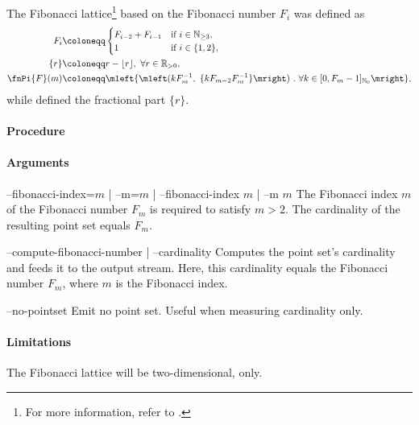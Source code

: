 
The Fibonacci lattice\footnote{For more information, refer to .} based on the Fibonacci number $F_i$ was defined as
\begin{align*}
  F_i &\coloneqq \begin{cases}
    F_{i-2} + F_{i-1} & \text{if}\ i \in \mathbb N_{\geq 3}, \\
    1 & \text{if}\ i \in \{1,2\},
  \end{cases}\\
  \{r\} &\coloneqq r - \lfloor r \rfloor,\ \forall r \in \mathbb R_{> 0}, \\
  \fnPi{F}(m) &\coloneqq \mleft\{ \mleft(k F_m^{-1},\ \{k F_{m-2} F_m^{-1}\} \mright)\ .\ \forall k \in [0,F_m-1]_{\mathbb N_0} \mright\},
\end{align*}
while  defined the fractional part $\{r\}$.

\paragraph{Procedure}

\begin{synopsis}
\end{synopsis}

\paragraph{Arguments}

\begin{procarg}{--fibonacci-index=$m$ | --m=$m$ | --fibonacci-index $m$ | --m $m$}
  The Fibonacci index $m$ of the Fibonacci number $F_m$ is required to satisfy $m > 2$. The cardinality of the resulting point set equals $F_m$.
\end{procarg}

\begin{procarg}{--compute-fibonacci-number | --cardinality}
  Computes the point set’s cardinality and feeds it to the output stream. Here, this cardinality equals the Fibonacci number $F_m$, where $m$ is the Fibonacci index.
\end{procarg}

\begin{procarg}{--no-pointset}
  Emit no point set. Useful when measuring cardinality only.
\end{procarg}

\procargout

\procargdelimiter

\procargsilent

\paragraph{Limitations}
The Fibonacci lattice will be two-dimensional, only.

